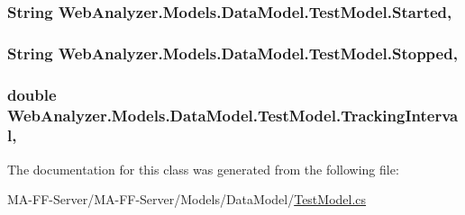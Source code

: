 \subsubsection[{Started}]{\setlength{\rightskip}{0pt plus 5cm}String Web\+Analyzer.\+Models.\+Data\+Model.\+Test\+Model.\+Started\hspace{0.3cm}{\ttfamily [get]}, {\ttfamily [set]}}\label{class_web_analyzer_1_1_models_1_1_data_model_1_1_test_model_acdb09845b9c3bc8582f78d2729524216}
\hypertarget{class_web_analyzer_1_1_models_1_1_data_model_1_1_test_model_a636a8cedde376c835de9d909e8ec2c2d}{}
\subsubsection[{Stopped}]{\setlength{\rightskip}{0pt plus 5cm}String Web\+Analyzer.\+Models.\+Data\+Model.\+Test\+Model.\+Stopped\hspace{0.3cm}{\ttfamily [get]}, {\ttfamily [set]}}\label{class_web_analyzer_1_1_models_1_1_data_model_1_1_test_model_a636a8cedde376c835de9d909e8ec2c2d}
\hypertarget{class_web_analyzer_1_1_models_1_1_data_model_1_1_test_model_a8f50461cf57a8d7c48b795b28335fbd3}{}
\subsubsection[{Tracking\+Interval}]{\setlength{\rightskip}{0pt plus 5cm}double Web\+Analyzer.\+Models.\+Data\+Model.\+Test\+Model.\+Tracking\+Interval\hspace{0.3cm}{\ttfamily [get]}, {\ttfamily [set]}}\label{class_web_analyzer_1_1_models_1_1_data_model_1_1_test_model_a8f50461cf57a8d7c48b795b28335fbd3}


The documentation for this class was generated from the following file\+:\begin{DoxyCompactItemize}
\item 
M\+A-\/\+F\+F-\/\+Server/\+M\+A-\/\+F\+F-\/\+Server/\+Models/\+Data\+Model/\hyperlink{_test_model_8cs}{Test\+Model.\+cs}\end{DoxyCompactItemize}
